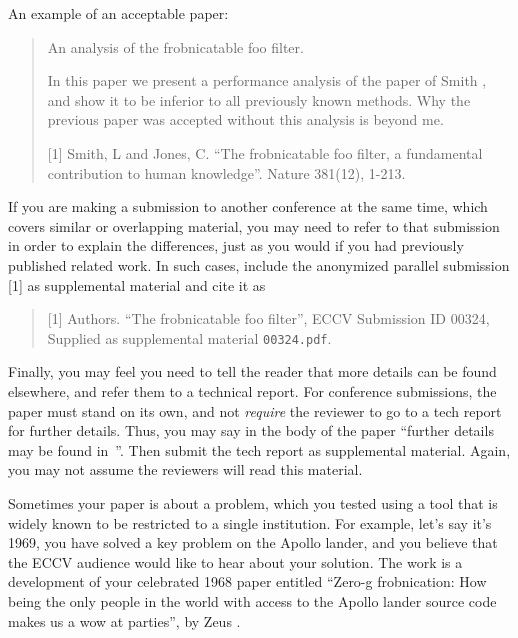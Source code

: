 \documentclass[runningheads]{llncs}
\begin{document}
An example of an acceptable paper:
\begin{quote}
  \begin{center}
     An analysis of the frobnicatable foo filter.
  \end{center}

   In this paper we present a performance analysis of the  paper of Smith \etal [1], and show it to be inferior to all previously known methods.
   Why the previous paper was accepted without this analysis is beyond me.

   [1] Smith, L and Jones, C. ``The frobnicatable foo filter, a fundamental contribution to human knowledge''. Nature 381(12), 1-213.
\end{quote}

If you are making a submission to another conference at the same time, which covers similar or overlapping material, you may need to refer to that submission in order to explain the differences, just as you would if you had previously published related work.
In such cases, include the anonymized parallel submission [1] as supplemental material and cite it as
\begin{quote}
  [1] Authors. ``The frobnicatable foo filter'', ECCV \ECCVyear Submission ID 00324, Supplied as supplemental material {\tt 00324.pdf}.
\end{quote}

Finally, you may feel you need to tell the reader that more details can be found elsewhere, and refer them to a technical report.
For conference submissions, the paper must stand on its own, and not \emph{require} the reviewer to go to a tech report for further details.
Thus, you may say in the body of the paper ``further details may be found in~\cite{Authors14b}''.
Then submit the tech report as supplemental material.
Again, you may not assume the reviewers will read this material.

Sometimes your paper is about a problem, which you tested using a tool that is widely known to be restricted to a single institution.
For example, let's say it's 1969, you have solved a key problem on the Apollo lander, and you believe that the ECCV audience would like to hear about your
solution.
The work is a development of your celebrated 1968 paper entitled ``Zero-g frobnication: How being the only people in the world with access to the Apollo lander source code makes us a wow at parties'', by Zeus \etal.
\end{document}
